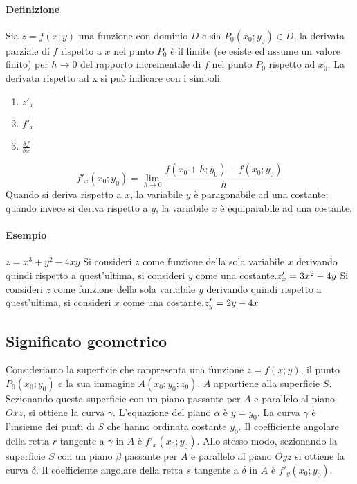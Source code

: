 \documentclass[a4paper,14pt]{extarticle}
\begin{document}
\paragraph{Definizione \\}Sia $z=f(x;y)$ una funzione con dominio $D$ e sia $P_0(x_0;y_0) \in D$, la derivata parziale di $f$ rispetto a $x$ nel punto $P_0$ è il limite (se esiste ed assume un valore finito) per $h \to 0$ del rapporto incrementale di $f$ nel punto $P_0$ rispetto ad $x_0$. \newline La derivata rispetto ad x si può indicare con i simboli:
\begin{enumerate}
  \item \Large $z'_x$ \normalsize
  \item \Large $f'_x$ \normalsize
  \item \Large $\frac{\delta f}{\delta x}$
\end{enumerate}
\large
\[f'_x (x_0;y_0)=\lim_{h \to 0} \frac{f(x_0+h; y_0)-f(x_0;y_0)}{h} \]
\normalsize
Quando si deriva rispetto a $x$, la variabile $y$ è paragonabile ad una costante; quando invece si deriva rispetto a $y$, la variabile $x$ è equiparabile ad una costante.
\paragraph{Esempio} $z=x^3+y^2-4xy$ \newline Si consideri $z$ come funzione della sola variabile $x$ derivando quindi rispetto a quest'ultima, si consideri $y$ come una costante.\newline  $ \\z'_x = 3x^2-4y \\$ \newline Si consideri $z$ come funzione della sola variabile $y$  derivando quindi rispetto a quest'ultima, si consideri $x$ come una costante.\newline  $ \\z'_y = 2y-4x$

\subsection{Significato geometrico} Consideriamo la superficie che rappresenta una funzione $z=f(x;y)$, il punto $P_0(x_0;y_0) $ e la sua immagine $A(x_0;y_0;z_0)$. $A$ appartiene alla superficie $S$. Sezionando questa superficie con un piano  passante per $A$ e parallelo al piano $Oxz$, si ottiene la curva $\gamma$. L’equazione del piano $\alpha$ è $y=y_0$. La curva $\gamma$ è l’insieme dei punti di $S$ che hanno ordinata costante $y_0$.
Il coefficiente angolare della retta $r$ tangente a $\gamma$ in $A$ è $f'_x(x_0;y_0)$. Allo stesso modo, sezionando la superficie $S$ con un piano $\beta$ passante per $A$ e parallelo al piano $Oyz$  si ottiene la curva $\delta$. Il coefficiente angolare della retta $s$ tangente a $\delta$ in $A$ è $f'_y(x_0;y_0)$. 
\end{document}
